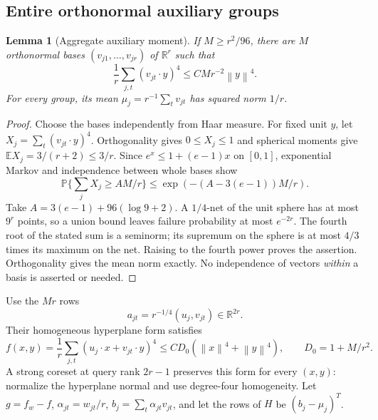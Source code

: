 \documentclass[11pt]{article}
\newtheorem{lemma}[theorem]{Lemma}
\theoremstyle{remark}\newtheorem{remark}[theorem]{Remark}
\newcommand{\R}{\mathbb R}\newcommand{\E}{\mathbb E}\newcommand{\Prob}{\mathbb P}
\newcommand{\norm}[1]{\left\lVert#1\right\rVert}\newcommand{\abs}[1]{\left|#1\right|}
\numberwithin{equation}{section}
\begin{document}
\subsection{Entire orthonormal auxiliary groups}
\begin{lemma}[Aggregate auxiliary moment]\label{lem:auxbases}
If $M\ge r^2/96$, there are $M$ orthonormal bases $(v_{j1},\ldots,v_{jr})$ of $\R^r$ such that
\[
 \frac1r\sum_{j,t}(v_{jt}\cdot y)^4\le CM r^{-2}\norm y^4.
\]
For every group, its mean $\mu_j=r^{-1}\sum_t v_{jt}$ has squared norm $1/r$.
\end{lemma}
\begin{proof}
Choose the bases independently from Haar measure. For fixed unit $y$, let $X_j=\sum_t(v_{jt}\cdot y)^4$. Orthogonality gives $0\le X_j\le1$ and spherical moments give $\E X_j=3/(r+2)\le3/r$. Since $e^x\le1+(e-1)x$ on $[0,1]$, exponential Markov and independence between whole bases show
\[
 \Prob\{\sum_jX_j\ge A M/r\}\le
 \exp(-(A-3(e-1))M/r).
\]
Take $A=3(e-1)+96(\log9+2)$. A $1/4$-net of the unit sphere has at most $9^r$ points, so a union bound leaves failure probability at most $e^{-2r}$. The fourth root of the stated sum is a seminorm; its supremum on the sphere is at most $4/3$ times its maximum on the net. Raising to the fourth power proves the assertion. Orthogonality gives the mean norm exactly. No independence of vectors \emph{within} a basis is asserted or needed.
\end{proof}

Use the $Mr$ rows
\begin{equation}\label{eq:lowerrows}
 a_{jt}=r^{-1/4}(u_j,v_{jt})\in\R^{2r}.
\end{equation}
Their homogeneous hyperplane form satisfies
\begin{equation}\label{eq:lowercost}
 f(x,y)=\frac1r\sum_{j,t}(u_j\cdot x+v_{jt}\cdot y)^4
 \le C D_0(\norm x^4+\norm y^4),\qquad D_0=1+M/r^2.
\end{equation}
A strong coreset at query rank $2r-1$ preserves this form for every $(x,y)$: normalize the hyperplane normal and use degree-four homogeneity. Let $g=f_w-f$, $\alpha_{jt}=w_{jt}/r$, $b_j=\sum_t\alpha_{jt}v_{jt}$, and let the rows of $H$ be $(b_j-\mu_j)^T$.
\end{document}
